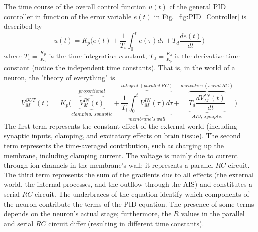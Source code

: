 %
%
%
The time course of the overall control function $u(t)$ of the general \gls{PID} controller in function of the error variable $e(t)$ in Fig.~\ref{fig:PID_Controller} is
described by
\begin{equation}
	u(t)= K_p\biggl( e(t)
	+ \frac{1}{T_i} \int_0^t e(\tau) d\tau
	+ T_d \frac{de(t)}{dt}\biggr)
	\label{eq:PID}
\end{equation}
where $T_i=\frac{K_p}{K_i}$ is the time integration constant, $T_d=\frac{K_d}{K_p}$
is the derivative time constant (notice the independent time constants).
That is, in the world of a neuron, the "theory of everything" is
\begin{equation}
	V_M^{OUT}(t)= K_p\biggl( \underbrace{\overbrace{V_M^{IN}(t)}^{proportional}}_{clamping,\ synaptic}
	+ \overbrace{\underbrace{\frac{1}{T_i} \int_0^t V_{M}^{IN}(\tau) d\tau}_{membrane's\ wall}}^{integral\ (parallel\ RC)}
	+ \overbrace{\underbrace{T_d \frac{dV_M^{IN}(t)}{dt}}}^{derivative\ (serial\ RC)}_{AIS,\ synaptic}\,\biggr)
	\label{eq:PID_Neuron}
\end{equation}
The first term represents the constant effect of the external world (including synaptic inputs, clamping, and excitatory effects on brain tissue).
The second term represents the time-averaged contribution, such as 
charging up the membrane, including clamping current. The voltage is mainly due to current through ion channels in the membrane's wall; it represents a parallel $RC$ circuit. The third term represents the sum of the gradients due to all effects (the external world, the internal processes, and the outflow through the \gls{AIS}) and constitutes a serial $RC$ circuit.
The underbraces of the equation identify which components of the neuron
contribute the terms of the \gls{PID} equation.
The presence of some terms depends on the neuron's actual stage; furthermore, the $R$ values in the parallel and serial $RC$ circuit differ
(resulting in different time constants). 




